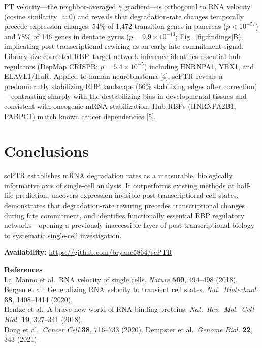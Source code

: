 \documentclass[10pt]{article}
\begin{document}
PT velocity---the neighbor-averaged $\gamma$ gradient---is orthogonal to RNA velocity
(cosine similarity $\approx 0$) and reveals that degradation-rate changes temporally
precede expression changes: 54\% of 1{,}472 transition genes in pancreas ($p < 10^{-57}$)
and 78\% of 146 genes in dentate gyrus ($p = 9.9 \times 10^{-13}$;
Fig.~\ref{fig:findings}B), implicating post-transcriptional rewiring as an early
fate-commitment signal. Library-size-corrected RBP--target network inference identifies
essential hub regulators (DepMap CRISPR; $p = 6.4 \times 10^{-5}$) including HNRNPA1,
YBX1, and ELAVL1/HuR. Applied to human neuroblastoma [4], scPTR reveals a predominantly
stabilizing RBP landscape (66\% stabilizing edges after correction)---contrasting sharply
with the destabilizing bias in developmental tissues and consistent with oncogenic mRNA
stabilization. Hub RBPs (HNRNPA2B1, PABPC1) match known cancer dependencies [5].

\section*{Conclusions}

scPTR establishes mRNA degradation rates as a measurable, biologically informative axis of
single-cell analysis. It outperforms existing methods at half-life prediction, uncovers
expression-invisible post-transcriptional cell states, demonstrates that degradation-rate
rewiring precedes transcriptional changes during fate commitment, and identifies
functionally essential RBP regulatory networks---opening a previously inaccessible layer of
post-transcriptional biology to systematic single-cell investigation.

\vspace{3pt}
\noindent\textbf{Availability:} \url{https://github.com/bryanc5864/scPTR}

\vspace{4pt}
\noindent\textbf{\small References}\\
{\footnotesize
\noindent [1] La~Manno et al.\ RNA velocity of single cells. \textit{Nature}
\textbf{560}, 494--498 (2018).
\enspace [2] Bergen et al.\ Generalizing RNA velocity to transient cell states.
\textit{Nat.\ Biotechnol.} \textbf{38}, 1408--1414 (2020).\\
\noindent [3] Hentze et al.\ A brave new world of RNA-binding proteins.
\textit{Nat.\ Rev.\ Mol.\ Cell Biol.} \textbf{19}, 327--341 (2018).\\
\noindent [4] Dong et al.\ \textit{Cancer Cell} \textbf{38}, 716--733 (2020).
\enspace [5] Dempster et al.\ \textit{Genome Biol.} \textbf{22}, 343 (2021).
}
\end{document}
